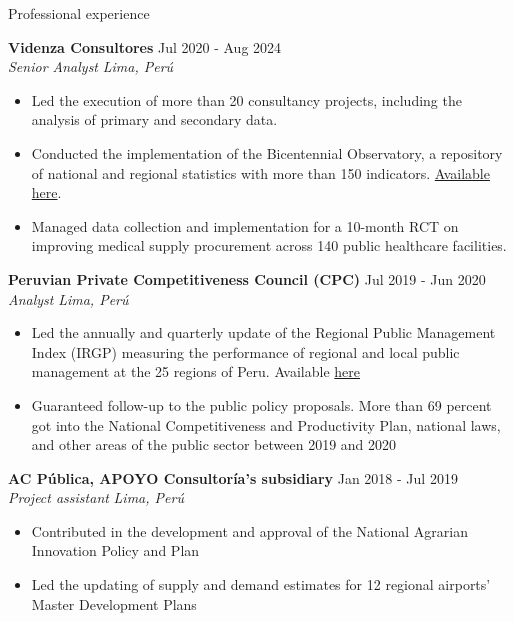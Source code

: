\documentclass{resume} %
\begin{document}
\begin{rSection}{Professional experience}

\textbf{Videnza Consultores} \hfill Jul 2020 - Aug 2024 \\
\textit{Senior Analyst}  \hfill \textit{Lima, Perú}
 \begin{itemize}
    \itemsep -3pt {} 
      \item Led the execution of more than 20 consultancy projects, including the analysis of primary and secondary data.
      \item Conducted the implementation of the Bicentennial Observatory, a repository of national and regional statistics with more than 150 indicators. \href{https://propuestasdelbicentenario.pe/observatorio/}{Available here}.
      \item Managed data collection and implementation for a 10-month RCT on improving medical supply procurement across 140 public healthcare facilities.
   \end{itemize}
 
 \textbf{Peruvian Private Competitiveness Council (CPC)} \hfill Jul 2019 - Jun 2020\\
\textit{Analyst} \hfill \textit{Lima, Perú}
 \begin{itemize}
    \itemsep -3pt {} 
      \item Led the annually and quarterly update of the Regional Public Management Index (IRGP) measuring the performance of regional and local public management at the 25 regions of Peru. Available \href{https://www.compite.pe/wp-content/uploads/2020/07/IRGP-2020-version-final.pdf}{here}
      \item Guaranteed follow-up to the public policy proposals. More than 69 percent got into the National Competitiveness and Productivity Plan, national laws, and other areas of the public sector between 2019 and 2020
 \end{itemize}

\textbf{AC Pública, APOYO Consultoría's subsidiary} \hfill Jan 2018 - Jul 2019\\
\textit{Project assistant} \hfill \textit{Lima, Perú}
 \begin{itemize}
    \itemsep -3pt {} 
     \item Contributed in the development and approval of the National Agrarian Innovation Policy and Plan
     \item Led the updating of supply and demand estimates for 12 regional airports’ Master Development Plans
 \end{itemize}
\end{rSection} 
\end{document}
